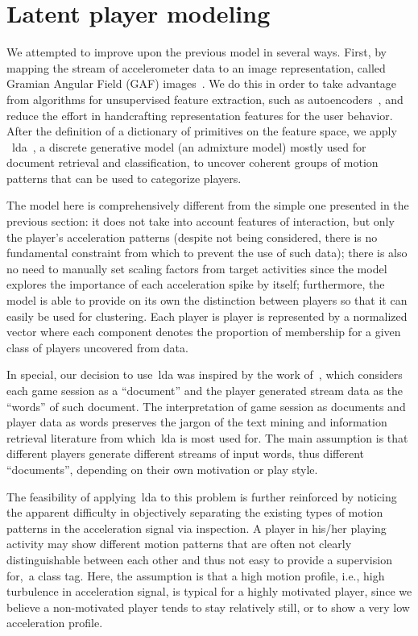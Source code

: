 \section{Latent player modeling}

We attempted to improve upon the previous model in several ways. First, by mapping the stream of accelerometer data to an image representation, called Gramian Angular Field (GAF) images~\citep{wang_imaging_2015}. We do this in order to take advantage from algorithms for unsupervised feature extraction, such as autoencoders~\citep{goodfellow_deep_2016}, and reduce the effort in handcrafting representation features for the user behavior. After the definition of a dictionary of primitives on the feature space, we apply ~\gls{lda}~\citep{blei_latent_2003}, a discrete generative model (an admixture model) mostly used for document retrieval and classification, to uncover coherent groups of motion patterns that can be used to categorize players.

The model here is comprehensively different from the simple one presented in the previous section: it does not take into account features of interaction, but only the player's acceleration patterns (despite not being considered, there is no fundamental constraint from which to prevent the use of such data); there is also no need to manually set scaling factors from target activities since the model explores the importance of each acceleration spike by itself; furthermore, the model is able to provide on its own the distinction between players so that it can easily be used for clustering. Each player is player is represented by a normalized vector where each component denotes the proportion of membership for a given class of players uncovered from data.

In special, our decision to use~\gls{lda} was inspired by the work of~\cite{smith_mining_2016}, which considers each game session as a ``document'' and the player generated stream data as the ``words'' of such document. The interpretation of game session as documents and player data as words preserves the jargon of the text mining and information retrieval literature from which~\gls{lda} is most used for. The main assumption is that different players generate different streams of input words, thus different  ``documents'', depending on their own motivation or play style. 

The feasibility of applying~\gls{lda} to this problem is further reinforced by noticing the apparent difficulty in objectively separating the existing types of motion patterns in the acceleration signal via inspection. A player in his/her playing activity may show different motion patterns that are often not clearly distinguishable between each other and thus not easy to provide a supervision for,~\ie a class tag. Here, the assumption is that a high motion profile, i.e., high turbulence in acceleration signal, is typical for a highly motivated player, since we believe a non-motivated player tends to stay relatively still, or to show a very low acceleration profile.

